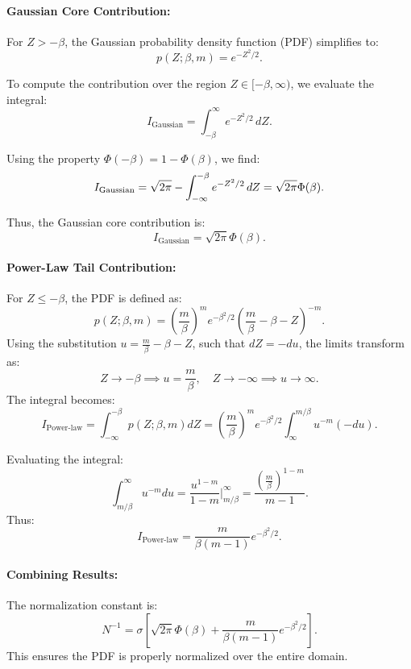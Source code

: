 \documentclass[11pt, a4paper]{article}
\begin{document}
\paragraph{Gaussian Core Contribution:}
For \( Z > -\beta \), the Gaussian probability density function (PDF) simplifies to:
\[
p(Z; \beta, m) = e^{-Z^2 / 2}.
\]

To compute the contribution over the region \( Z \in [-\beta, \infty) \), we evaluate the integral:
\[
I_{\text{Gaussian}} = \int_{-\beta}^\infty e^{-Z^2 / 2} \, dZ.
\]

Using the property \( \Phi(-\beta) = 1 - \Phi(\beta) \), we find:
\[
I_{\text{Gaussian}} = \sqrt{2\pi} - \int_{-\infty}^{-\beta} e^{-Z^2 / 2} \, dZ \\
= \sqrt{2\pi} \Phi(\beta).
\]

Thus, the Gaussian core contribution is:
\begin{equation}
    I_{\text{Gaussian}} = \sqrt{2\pi} \Phi(\beta).
    \label{eq:gaussian_contribution}
\end{equation}

\paragraph{Power-Law Tail Contribution:}
For \( Z \leq -\beta \), the PDF is defined as:
\[
p(Z; \beta, m) = \left( \frac{m}{\beta} \right)^m e^{-\beta^2 / 2} \left( \frac{m}{\beta} - \beta - Z \right)^{-m}.
\]
Using the substitution \( u = \frac{m}{\beta} - \beta - Z \), such that \( dZ = -du \), the limits transform as:
\[
Z \to -\beta \implies u = \frac{m}{\beta}, \quad Z \to -\infty \implies u \to \infty.
\]
The integral becomes:
\[
I_{\text{Power-law}} = \int_{-\infty}^{-\beta} p(Z; \beta, m) dZ = \left( \frac{m}{\beta} \right)^m e^{-\beta^2 / 2} \int_{\infty}^{m / \beta} u^{-m} (-du).
\]

Evaluating the integral:
\[
\int_{m / \beta}^\infty u^{-m} du = \frac{u^{1-m}}{1-m} \bigg|_{m / \beta}^\infty = \frac{\left( \frac{m}{\beta} \right)^{1-m}}{m - 1}.
\]
Thus:
\begin{equation}
    I_{\text{Power-law}} = \frac{m}{\beta (m - 1)} e^{-\beta^2 / 2}.
    \label{eq:powerlaw_contribution}
\end{equation}

\paragraph{Combining Results:}
The normalization constant is:
\begin{equation}
    N^{-1} = \sigma \left[ \sqrt{2\pi} \Phi(\beta) + \frac{m}{\beta (m - 1)} e^{-\beta^2 / 2} \right].
    \label{eq:final_normalization_constant}
\end{equation}
This ensures the PDF is properly normalized over the entire domain.
\end{document}

